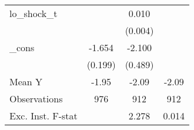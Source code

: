 {\begin{tabular}{l*{3}{c}}
\addlinespace
lo\_shock\_t  &                     &       0.010\sym{**} &                     \\
            &                     &     (0.004)         &                     \\
\addlinespace
\_cons      &      -1.654\sym{***}&      -2.100\sym{***}&                     \\
            &     (0.199)         &     (0.489)         &                     \\
\midrule
Mean Y      &       -1.95         &       -2.09         &       -2.09         \\
Observations&         976         &         912         &         912         \\
Exc. Inst. F-stat&                     &       2.278         &       0.014         \\
\bottomrule
\end{tabular}
}

